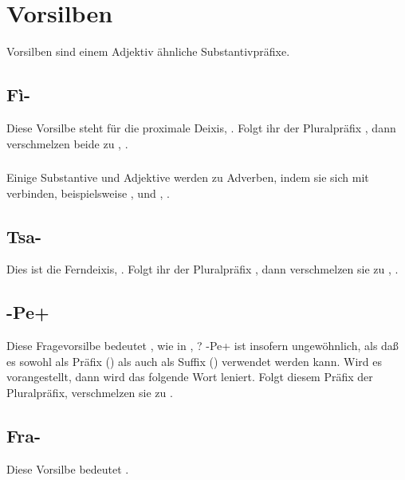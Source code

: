 \section{Vorsilben}

\noindent Vorsilben sind einem Adjektiv \"ahnliche Substantivpr\"afixe.

\subsection{F\`i-} Diese Vorsilbe steht für die proximale Deixis, . Folgt
ihr der Pluralpr\"afix , dann verschmelzen beide zu , .
\label{morph:prenoun:fi}

\subsubsection{} Einige Substantive und Adjektive werden zu Adverben, indem sie sich
mit  verbinden, beispielsweise ,  und , .

\subsection{Tsa-} Dies ist die Ferndeixis, . Folgt ihr der Pluralpr\"afix
, dann verschmelzen sie zu , .
 

\subsection{-Pe+} \label{morph:pre:pe} Diese Fragevorsilbe bedeutet ,
wie in , ? -Pe+ ist insofern ungew\"ohnlich, als da\ss{} es sowohl
als Pr\"afix () als auch als Suffix () verwendet werden kann.
Wird es vorangestellt, dann wird das folgende Wort leniert.
Folgt diesem Pr\"afix der Pluralpr\"afix, verschmelzen sie zu .

\subsection{Fra-} Diese Vorsilbe bedeutet . 
 

